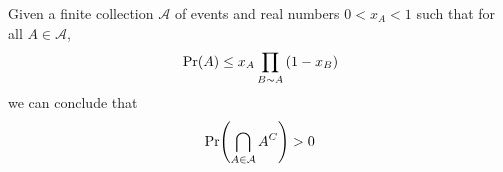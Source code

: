 \begin{boxtheorem} \label{Ch5:Thm:LLL}
    Given a finite collection $\mathcal{A}$ of events and real numbers $0 < x_A < 1$ such that for all $A \in \mathcal{A}$,
    \begin{align*}
        \Pr\!\left( A \right) \leq x_A \prod_{B \sim A} \left( 1 - x_B \right)
    \end{align*}
    we can conclude that
    \begin{align*}
        \Pr\!\left( \bigcap_{A \in \mathcal{A}} A^C \right) > 0
    \end{align*}
\end{boxtheorem}
